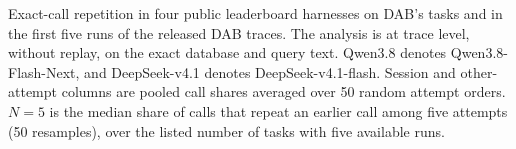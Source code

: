 \begin{table}[htbp]
  \caption{Exact-call repetition in four public leaderboard harnesses on DAB's tasks and in the first five runs of the
  released DAB traces. The analysis is at trace level, without replay, on the exact database and query text. Qwen3.8
  denotes Qwen3.8-Flash-Next, and DeepSeek-v4.1 denotes DeepSeek-v4.1-flash. Session and other-attempt columns are
  pooled call shares averaged over 50 random attempt orders. $N{=}5$ is the median share of calls that repeat an
  earlier call among five attempts (50 resamples), over the listed number of tasks with five available runs.}
  \label{tab:xharness}
  \footnotesize\setlength{\tabcolsep}{2.5pt}
  
\end{table}
